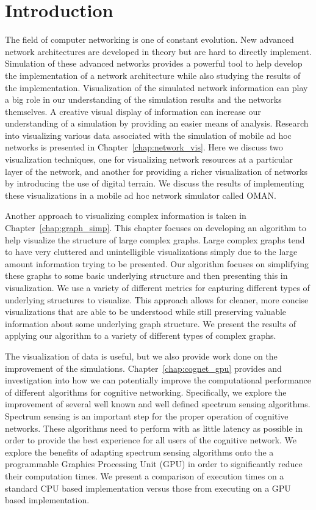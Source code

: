 \chapter{Introduction}

The field of computer networking is one of constant evolution.  New advanced network architectures are developed in theory but are hard to directly implement.  Simulation of these advanced networks provides a powerful tool to help develop the implementation of a network architecture while also studying the results of the implementation.  Visualization of the simulated network information can play a big role in our understanding of the simulation results and the networks themselves.  A creative visual display of information can increase our understanding of a simulation by providing an easier means of analysis.  Research into visualizing various data associated with the simulation of mobile ad hoc networks is presented in Chapter~\ref{chap:network_vis}.  Here we discuss two visualization techniques, one for visualizing network resources at a particular layer of the network, and another for providing a richer visualization of networks by introducing the use of digital terrain.  We discuss the results of implementing these visualizations in a mobile ad hoc network simulator called OMAN.

Another approach to visualizing complex information is taken in Chapter~\ref{chap:graph_simp}.  This chapter focuses on developing an algorithm to help visualize the structure of large complex graphs.  Large complex graphs tend to have very cluttered and unintelligible visualizations simply due to the large amount information trying to be presented.  Our algorithm focuses on simplifying these graphs to some basic underlying structure and then presenting this in visualization.  We use a variety of different metrics for capturing different types of underlying structures to visualize.  This approach allows for cleaner, more concise visualizations that are able to be understood while still preserving valuable information about some underlying graph structure.  We present the results of applying our algorithm to a variety of different types of complex graphs.

The visualization of data is useful, but we also provide work done on the improvement of the simulations.  Chapter~\ref{chap:cognet_gpu} provides and investigation into how we can potentially improve the computational performance of different algorithms for cognitive networking.  Specifically, we explore the improvement of several well known and well defined spectrum sensing algorithms.  Spectrum sensing is an important step for the proper operation of cognitive networks.  These algorithms need to perform with as little latency as possible in order to provide the best experience for all users of the cognitive network.  We explore the benefits of adapting spectrum sensing algorithms onto the a programmable Graphics Processing Unit (GPU) in order to significantly reduce their computation times.  We present a comparison of execution times on a standard CPU based implementation versus those from executing on a GPU based implementation. 
